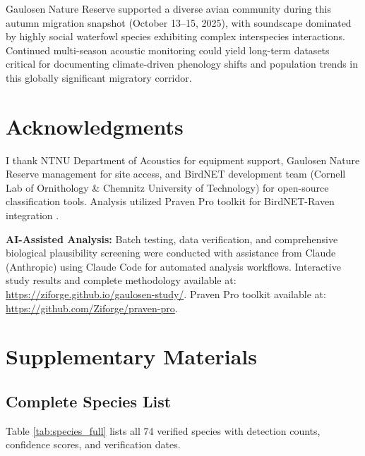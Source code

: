 \documentclass[twocolumn]{article}
\begin{document}
Gaulosen Nature Reserve supported a diverse avian community during this autumn migration snapshot (October 13--15, 2025), with soundscape dominated by highly social waterfowl species exhibiting complex interspecies interactions. Continued multi-season acoustic monitoring could yield long-term datasets critical for documenting climate-driven phenology shifts and population trends in this globally significant migratory corridor.

\section*{Acknowledgments}

I thank NTNU Department of Acoustics for equipment support, Gaulosen Nature Reserve management for site access, and BirdNET development team (Cornell Lab of Ornithology \& Chemnitz University of Technology) for open-source classification tools. Analysis utilized Praven Pro toolkit for BirdNET-Raven integration \citep{Redpath2025}.

\textbf{AI-Assisted Analysis:} Batch testing, data verification, and comprehensive biological plausibility screening were conducted with assistance from Claude (Anthropic) using Claude Code for automated analysis workflows. Interactive study results and complete methodology available at: \url{https://ziforge.github.io/gaulosen-study/}. Praven Pro toolkit available at: \url{https://github.com/Ziforge/praven-pro}.


\newpage
\onecolumn

\appendix
\section{Supplementary Materials}

\subsection{Complete Species List}

Table \ref{tab:species_full} lists all 74 verified species with detection counts, confidence scores, and verification dates.
\end{document}
